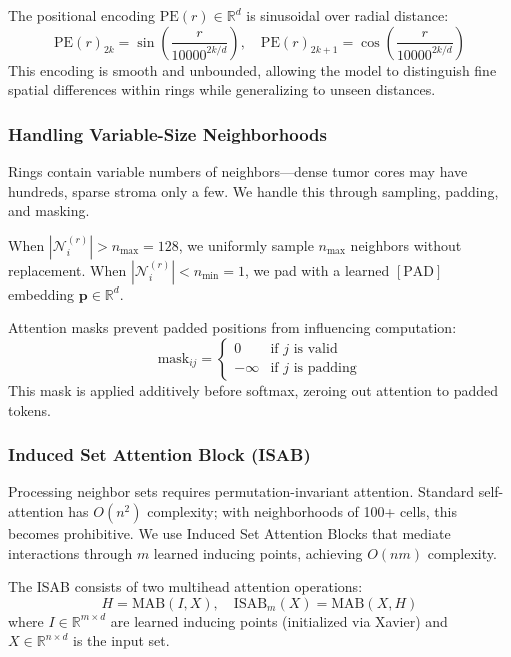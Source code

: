 The positional encoding $\text{PE}(r) \in \mathbb{R}^d$ is sinusoidal over radial distance:
\begin{equation}
    \text{PE}(r)_{2k} = \sin\left(\frac{r}{10000^{2k/d}}\right), \quad \text{PE}(r)_{2k+1} = \cos\left(\frac{r}{10000^{2k/d}}\right)
\end{equation}
This encoding is smooth and unbounded, allowing the model to distinguish fine spatial differences within rings while generalizing to unseen distances.

\subsubsection{Handling Variable-Size Neighborhoods}

Rings contain variable numbers of neighbors—dense tumor cores may have hundreds, sparse stroma only a few. We handle this through sampling, padding, and masking.

When $|\mathcal{N}_i^{(r)}| > n_{\max} = 128$, we uniformly sample $n_{\max}$ neighbors without replacement. When $|\mathcal{N}_i^{(r)}| < n_{\min} = 1$, we pad with a learned $[\text{PAD}]$ embedding $\mathbf{p} \in \mathbb{R}^d$.

Attention masks prevent padded positions from influencing computation:
\begin{equation}
    \text{mask}_{ij} = \begin{cases} 0 & \text{if } j \text{ is valid} \\ -\infty & \text{if } j \text{ is padding} \end{cases}
\end{equation}
This mask is applied additively before softmax, zeroing out attention to padded tokens.

\subsubsection{Induced Set Attention Block (ISAB)}

Processing neighbor sets requires permutation-invariant attention. Standard self-attention has $O(n^2)$ complexity; with neighborhoods of 100+ cells, this becomes prohibitive. We use Induced Set Attention Blocks that mediate interactions through $m$ learned inducing points, achieving $O(nm)$ complexity.

The ISAB consists of two multihead attention operations:
\begin{equation}
    H = \text{MAB}(I, X), \quad \text{ISAB}_m(X) = \text{MAB}(X, H)
\end{equation}
where $I \in \mathbb{R}^{m \times d}$ are learned inducing points (initialized via Xavier) and $X \in \mathbb{R}^{n \times d}$ is the input set.

